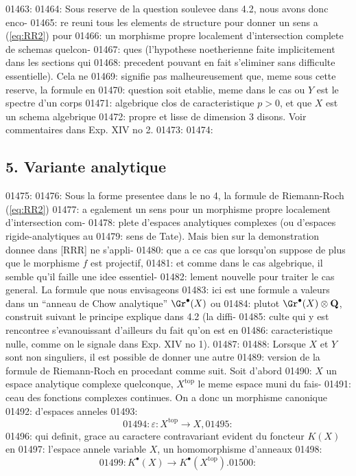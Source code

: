 01463: 
01464: Sous reserve de la question soulevee dans 4.2, nous avons donc enco-
01465: re reuni tous les elements de structure pour donner un sens a (\ref{eq:RR2}) pour
01466: un morphisme propre localement d'intersection complete de schemas quelcon-
01467: ques (l'hypothese noetherienne faite implicitement dans les sections qui
01468: precedent pouvant en fait s'eliminer sans difficulte essentielle). Cela ne
01469: signifie pas malheureusement que, meme sous cette reserve, la formule en
01470: question soit etablie, meme dans le cas ou $Y$ est le spectre d'un corps
01471: algebrique clos de caracteristique $p > 0$, et que $X$ est un schema algebrique
01472: propre et lisse de dimension 3 disons. Voir commentaires dans Exp. XIV no 2.
01473: 
01474: \subsection*{5. Variante analytique}
01475: 
01476: Sous la forme presentee dans le no 4, la formule de Riemann-Roch (\ref{eq:RR2})
01477: a egalement un sens pour un morphisme propre localement d'intersection com-
01478: plete d'espaces analytiques complexes (ou d'espaces rigide-analytiques au
01479: sens de Tate). Mais bien sur la demonstration donnee dans [RRR] ne s'appli-
01480: que a ce cas que lorsqu'on suppose de plus que le morphisme $f$ est projectif,
01481: et comme dans le cas algebrique, il semble qu'il faille une idee essentiel-
01482: lement nouvelle pour traiter le cas general. La formule que nous envisageons
01483: ici est une formule a valeurs dans un ``anneau de Chow analytique'' $\Gr^{\bullet}(X)$ ou
01484: plutot $\Gr^{\bullet}(X) \otimes \mathbf{Q}$, construit suivant le principe explique dans 4.2 (la diffi-
01485: culte qui y est rencontree s'evanouissant d'ailleurs du fait qu'on est en
01486: caracteristique nulle, comme on le signale dans Exp. XIV no 1).
01487: 
01488: Lorsque $X$ et $Y$ sont non singuliers, il est possible de donner une autre
01489: version de la formule de Riemann-Roch en procedant comme suit. Soit d'abord
01490: $X$ un espace analytique complexe quelconque, $X^{\text{top}}$ le meme espace muni du fais-
01491: ceau des fonctions complexes continues. On a donc un morphisme canonique
01492: d'espaces anneles
01493: \[
01494: \varepsilon: X^{\text{top}} \longrightarrow X,
01495: \]
01496: qui definit, grace au caractere contravariant evident du foncteur $K(X)$ en
01497: l'espace annele variable $X$, un homomorphisme d'anneaux
01498: \begin{equation}
01499: K^{\bullet}(X) \longrightarrow K^{\bullet}(X^{\text{top}}).
01500: \end{equation}
